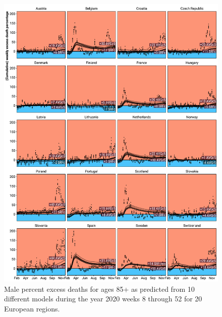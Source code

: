 \documentclass[12pt]{article}
\begin{document}
\begin{appendix}
\begin{figure}
\caption{
Male percent excess deaths for ages 85+ as predicted from 10 different models during the year 2020 weeks 8 through 52 for 20 European regions.}
\label{fig:excessm85plus}
\includegraphics{excess_male__85_inf_.pdf}
\end{figure}



\end{appendix}
\end{document}
